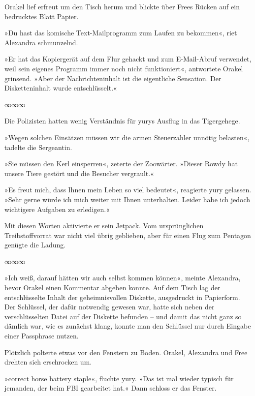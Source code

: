 Orakel lief erfreut um den Tisch herum und blickte über Frees Rücken auf ein bedrucktes Blatt Papier.

»Du hast das komische Text-Mailprogramm zum Laufen zu bekommen«, riet Alexandra schmunzelnd.

»Er hat das Kopiergerät auf dem Flur gehackt und zum E-Mail-Abruf verwendet, weil sein eigenes Programm immer noch nicht funktioniert«, antwortete Orakel grinsend. »Aber der Nachrichteninhalt ist die eigentliche Sensation. Der Disketteninhalt wurde entschlüsselt.«

\begin{center}
	∞∞∞
\end{center}

Die Polizisten hatten wenig Verständnis für yurys Ausflug in das Tigergehege.

»Wegen solchen Einsätzen müssen wir die armen Steuerzahler unnötig belasten«, tadelte die Sergeantin.

»Sie müssen den Kerl einsperren«, zeterte der Zoowärter. »Dieser Rowdy hat unsere Tiere gestört und die Besucher vergrault.«

»Es freut mich, dass Ihnen mein Leben so viel bedeutet«, reagierte yury gelassen. »Sehr gerne würde ich mich weiter mit Ihnen unterhalten. Leider habe ich jedoch wichtigere Aufgaben zu erledigen.«

Mit diesen Worten aktivierte er sein Jetpack. Vom ursprünglichen Treibstoffvorrat war nicht viel übrig geblieben, aber für einen Flug zum Pentagon genügte die Ladung.

\begin{center}
	∞∞∞
\end{center}

»Ich weiß, darauf hätten wir auch selbst kommen können«, meinte Alexandra, bevor Orakel einen Kommentar abgeben konnte. Auf dem Tisch lag der entschlüsselte Inhalt der geheimnisvollen Diskette, ausgedruckt in Papierform. Der Schlüssel, der dafür notwendig gewesen war, hatte sich neben der verschlüsselten Datei auf der Diskette befunden – und damit das nicht ganz so dämlich war, wie es zunächst klang, konnte man den Schlüssel nur durch Eingabe einer Passphrase nutzen.

Plötzlich polterte etwas vor den Fenstern zu Boden. Orakel, Alexandra und Free drehten sich erschrocken um.

»correct horse battery staple«, fluchte yury. »Das ist mal wieder typisch für jemanden, der beim FBI gearbeitet hat.« Dann schloss er das Fenster.

